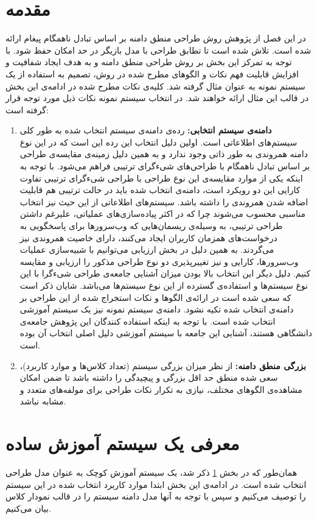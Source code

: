 \section{مقدمه}
\label{sectio:design:preface}
در این فصل از پژوهش روش طراحی منطق دامنه بر اساس تبادل ناهمگام پیغام ارائه شده است. تلاش شده است تا تطابق طراحی با مدل بازیگر در حد امکان حفظ شود. با توجه به تمرکز این بخش بر روش طراحی منطق دامنه و به هدف ایجاد شفافیت و افزایش قابلیت فهم نکات و الگوهای مطرح شده در روش، تصمیم به استفاده از یک سیستم نمونه به عنوان مثال گرفته شد. کلیه‌ی نکات مطرح شده در ادامه‌ی این بخش در قالب این مثال ارائه خواهند شد. در انتخاب سیستم نمونه نکات ذیل مورد توجه قرار گرفته‌ است:
\begin{enumerate}
\item \textbf{دامنه‌ی سیستم انتخابی:}
رده‌ی دامنه‌ی سیستم انتخاب شده به طور کلی سیستم‌های اطلاعاتی است. اولین دلیل انتخاب این رده این است که در این نوع دامنه همروندی به طور ذاتی وجود ندارد و به همین دلیل زمینه‌ی مقایسه‌ی طراحی بر اساس تبادل ناهمگام با  طراحی‌های شیءگرای ترتیبی فراهم می‌شود. با توجه به اینکه یکی از موارد مقایسه‌ی این نوع طراحی با طراحی شیءگرای ترتیبی تفاوت کارایی این دو رویکرد است، دامنه‌ی انتخاب شده باید در حالت ترتیبی هم قابلیت اضافه شدن همروندی را داشته باشد. سیستم‌های اطلاعاتی از این حیث نیز انتخاب مناسبی محسوب می‌شوند چرا که در اکثر پیاده‌سازی‌های عملیاتی، علیرغم داشتن طراحی ترتیبی، به وسیله‌ی ریسمان‌هایی که وب‌سرورها برای پاسخگویی به درخواست‌های همزمان کاربران ایجاد می‌کنند، دارای خاصیت همروندی نیز می‌گردند. به همین دلیل در بخش ارزیابی می‌توانیم با شبیه‌سازی عملیات وب‌سرورها، کارایی و نیز تغییرپذیری دو نوع طراحی مذکور را ارزیابی و مقایسه کنیم.
 دلیل دیگر این انتخاب بالا بودن میزان آشنایی جامعه‌ی طراحی شیءگرا با این نوع سیستم‌ها و استفاده‌ی گسترده از این نوع سیستم‌ها می‌باشد. شایان ذکر است که سعی شده است در ارائه‌ی الگوها و نکات استخراج شده از این طراحی بر دامنه‌ی انتخاب شده تکیه‌ نشود. دامنه‌ی سیستم نمونه نیز یک سیستم آموزشی انتخاب شده است. با توجه به اینکه استفاده کنندگان این پژوهش جامعه‌ی دانشگاهی هستند، آشنایی این جامعه با سیستم آموزشی دلیل اصلی انتخاب آن بوده است. 
\item \textbf{ بزرگی منطق دامنه:}
از نظر میزان بزرگی سیستم (تعداد کلاس‌ها و موارد کاربرد)،‌  سعی شده منطق حد اقل بزرگی و پیچیدگی را داشته باشد تا ضمن امکان مشاهده‌ی الگوهای مختلف، نیازی به تکرار نکات طراحی برای مولفه‌های متعدد و مشابه نباشد. 
\end{enumerate} 

\section{معرفی یک سیستم آموزش ساده }
\label{section:eduIntro}
همان‌طور که در بخش \ref{sectio:design:preface} ذکر شد،‌ یک سیستم آموزش کوچک به عنوان مدل طراحی انتخاب شده است. در ادامه‌ی این بخش ابتدا موارد کاربرد انتخاب شده در این سیستم را توصیف می‌کنیم و سپس با توجه به‌ آنها مدل دامنه سیستم را در قالب نمودار کلاس بیان می‌کنیم.


